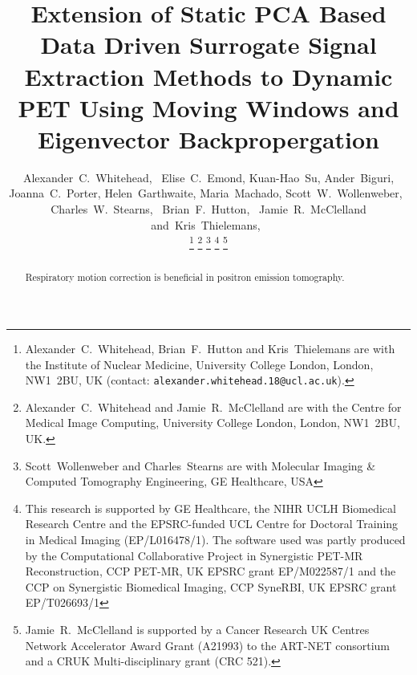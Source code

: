\documentclass[10pt, twocolumn, twoside, letterpaper]{IEEEtran}
\begin{document}
\title{Extension of Static PCA Based Data Driven Surrogate Signal Extraction Methods to Dynamic PET Using Moving Windows and Eigenvector Backpropergation}

\pagestyle{plain}

\author{Alexander~C.~Whitehead,~
        Elise~C.~Emond,
        Kuan-Hao~Su,
        Ander~Biguri,
        Joanna~C.~Porter,
        Helen~Garthwaite,
        Maria~Machado,
        Scott~W.~Wollenweber,~
        Charles~W.~Stearns,~
        Brian~F.~Hutton,~
        Jamie~R.~McClelland
        and~Kris~Thielemans,~%

    \thanks{Alexander~C.~Whitehead, Brian~F.~Hutton and Kris~Thielemans are with the Institute of Nuclear Medicine, University College London, London, NW1~2BU, UK (contact: \texttt{alexander.whitehead.18@ucl.ac.uk}).}%
    \thanks{Alexander~C.~Whitehead and Jamie~R.~McClelland are with the Centre for Medical Image Computing, University College London, London, NW1~2BU, UK.}%
    \thanks{Scott~Wollenweber and Charles~Stearns are with Molecular Imaging \& Computed Tomography Engineering, GE Healthcare, USA}%
    \thanks{This research is supported by GE Healthcare, the NIHR UCLH Biomedical Research Centre and the EPSRC-funded UCL Centre for Doctoral Training in Medical Imaging (EP/L016478/1). The software used was partly produced by the Computational Collaborative Project in Synergistic PET-MR Reconstruction, CCP PET-MR, UK EPSRC grant EP/M022587/1 and the CCP on Synergistic Biomedical Imaging, CCP SyneRBI, UK EPSRC grant EP/T026693/1}%
    \thanks{Jamie~R.~McClelland is supported by a Cancer Research UK Centres Network Accelerator Award Grant (A21993) to the ART-NET consortium and a CRUK Multi-disciplinary grant (CRC 521).}%
}

\maketitle
\IEEEpeerreviewmaketitle

\begin{abstract}
    Respiratory motion correction is beneficial in positron emission tomography.
\end{abstract}



\AtNextBibliography{\scriptsize}
\printbibliography
\end{document}
